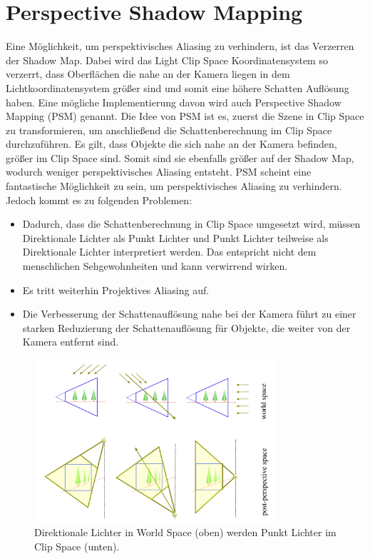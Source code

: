 \section{Perspective Shadow Mapping}
\label{section:psm}
Eine Möglichkeit, um perspektivisches Aliasing zu verhindern, ist das Verzerren 
der Shadow Map. 
Dabei wird das Light Clip Space Koordinatensystem so verzerrt, dass Oberflächen die nahe an der Kamera liegen in dem
Lichtkoordinatensystem größer sind und somit eine höhere Schatten Auflösung haben.
\newline
Eine mögliche Implementierung davon wird auch Perspective Shadow Mapping (PSM) \cite{PSM2002} genannt.
Die Idee von PSM ist es, zuerst die Szene in Clip Space zu transformieren, um anschließend die Schattenberechnung 
im Clip Space durchzuführen.
Es gilt, dass Objekte die sich nahe an der Kamera befinden, größer im Clip Space sind.
Somit sind sie ebenfalls größer auf der Shadow Map, wodurch weniger perspektivisches 
Aliasing entsteht.
PSM scheint eine fantastische Möglichkeit zu sein, um perspektivisches Aliasing zu verhindern.
Jedoch kommt es zu folgenden Problemen:
\begin{itemize}
  \item Dadurch, dass die Schattenberechnung in Clip Space umgesetzt wird,
    müssen Direktionale Lichter als Punkt Lichter und Punkt Lichter teilweise als Direktionale Lichter interpretiert werden.
    Das entspricht nicht dem menschlichen Sehgewohnheiten und kann verwirrend wirken.
  \item Es tritt weiterhin Projektives Aliasing auf.
  \item Die Verbesserung der Schattenauflösung nahe bei der Kamera führt zu einer starken Reduzierung der Schattenauflösung
    für Objekte, die weiter von der Kamera entfernt sind.
\end{itemize}
\begin{figure}
	\begin{center}
    \includegraphics[width=0.8\textwidth]{res/img/psm_dir_lights.png}
    \caption{Direktionale Lichter in World Space (oben) werden Punkt Lichter im Clip Space (unten).}
	  \label{fig:psm-dir-lights}
	\end{center}
\end{figure}
